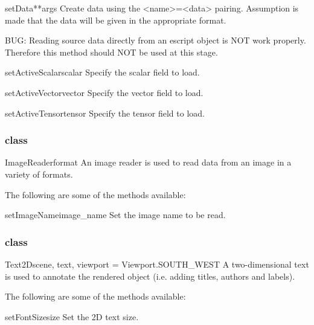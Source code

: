 \begin{methoddesc}[DataCollector]{setData}{**args}
Create data using the \textless name\textgreater=\textless data\textgreater 
pairing. Assumption is made that the data will be given in the 
appropriate format.

BUG: Reading source data directly from an escript object is NOT
work properly. Therefore this method should NOT be used at this stage.
\end{methoddesc}

\begin{methoddesc}[DataCollector]{setActiveScalar}{scalar}
Specify the scalar field to load.
\end{methoddesc}

\begin{methoddesc}[DataCollector]{setActiveVector}{vector}
Specify the vector field to load.
\end{methoddesc}

\begin{methoddesc}[DataCollector]{setActiveTensor}{tensor}
Specify the tensor field to load.
\end{methoddesc}

\subsubsection{\ImageReader class}

\begin{classdesc}{ImageReader}{format}
An image reader is used to read data from an image in a variety of formats.
\end{classdesc}

The following are some of the methods available:
\begin{methoddesc}[ImageReader]{setImageName}{image_name}
Set the image name to be read.
\end{methoddesc}

\subsubsection{\TextTwoD class}

\begin{classdesc}{Text2D}{scene, text, viewport = Viewport.SOUTH_WEST}
A two-dimensional text is used to annotate the rendered object 
(i.e. adding titles, authors and labels).
\end{classdesc}

The following are some of the methods available:
\begin{methoddesc}[Text2D]{setFontSize}{size}
Set the 2D text size.
\end{methoddesc}

